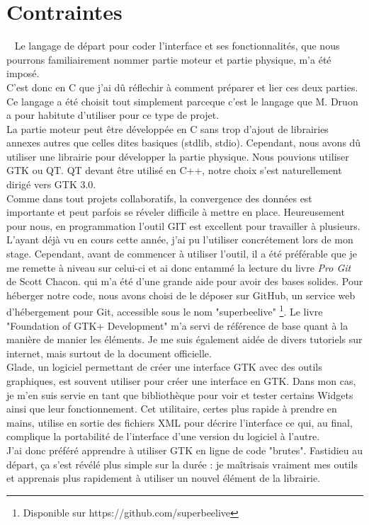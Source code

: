 \documentclass[11pt,french,a4paper]{report}
\begin{document}
    \section{Contraintes} 
Le langage de départ pour coder l'interface et ses fonctionnalités, que nous pourrons familiairement nommer partie moteur 
et partie physique, m'a été imposé. \\
C'est donc en C que j'ai dû réflechir à comment préparer et lier ces deux parties. Ce langage a été choisit tout simplement 
parceque c'est  le langage que M. Druon a pour habitute d'utiliser pour ce type de projet. \\
La partie moteur peut être développée en C sans trop d'ajout de librairies annexes autres que celles dites basiques 
(stdlib, stdio). 
Cependant, nous avons dû utiliser une librairie pour développer la partie physique. Nous pouvions utiliser GTK ou QT. 
QT devant être utilisé en C++, notre choix s'est naturellement dirigé vers GTK 3.0. \\
Comme dans tout projets collaboratifs, la convergence des données est importante et peut parfois se réveler difficile à mettre en place. 
Heureusement pour nous, en programmation l'outil GIT est excellent pour travailler à plusieurs. L'ayant déjà vu en cours cette année,
j'ai pu l'utiliser concrétement lors de mon stage. Cependant, avant de commencer à utiliser l'outil, il a été préférable que 
je me remette à niveau sur celui-ci et ai donc entammé la lecture du livre \textit{Pro Git} de Scott Chacon. %
qui m'a été d'une grande aide pour avoir des bases solides. Pour héberger notre code, nous avons choisi de le déposer sur GitHub,
un service web d'hébergement pour Git, accessible sous le nom "superbeelive" \footnote{Disponible sur https://github.com/superbeelive}.
Le livre "Foundation of GTK+ Development" m'a servi de référence de base quant à la manière de manier les éléments. 
Je me suis également aidée de divers tutoriels sur internet, mais surtout de la document officielle. %
\\
Glade, un logiciel permettant de créer une interface GTK avec des outils graphiques, est souvent utiliser pour créer une interface
en GTK.
Dans mon cas, je m'en suis servie en tant que bibliothèque pour voir et tester certains Widgets ainsi que leur fonctionnement.
Cet utilitaire, certes plus rapide à prendre en mains, utilise en sortie des fichiers XML pour décrire l'interface ce qui, 
au final, complique la portabilité de l'interface d'une version du logiciel à l'autre. \\ 
J'ai donc préféré apprendre à utiliser GTK en ligne de code "brutes". Fastidieu au départ, 
ça s'est révélé plus simple sur la durée : je maîtrisais vraiment mes outils et apprenais plus rapidement à utiliser 
un nouvel élément de la librairie.  
\end{document}
